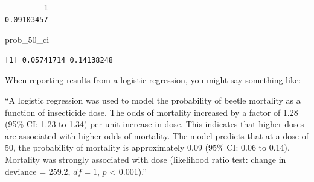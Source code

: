 \documentclass[
  letterpaper,
  8pt,
  a4paper]{book}
\newenvironment{Shaded}{\begin{snugshade}}{\end{snugshade}}
\newcommand{\AttributeTok}[1]{\textcolor[rgb]{0.40,0.45,0.13}{#1}}
\newcommand{\ConstantTok}[1]{\textcolor[rgb]{0.56,0.35,0.01}{#1}}
\newcommand{\DecValTok}[1]{\textcolor[rgb]{0.68,0.00,0.00}{#1}}
\newcommand{\FloatTok}[1]{\textcolor[rgb]{0.68,0.00,0.00}{#1}}
\newcommand{\FunctionTok}[1]{\textcolor[rgb]{0.28,0.35,0.67}{#1}}
\newcommand{\NormalTok}[1]{\textcolor[rgb]{0.00,0.23,0.31}{#1}}
\newcommand{\OtherTok}[1]{\textcolor[rgb]{0.00,0.23,0.31}{#1}}
\newcommand{\SpecialCharTok}[1]{\textcolor[rgb]{0.37,0.37,0.37}{#1}}
\newcommand{\StringTok}[1]{\textcolor[rgb]{0.13,0.47,0.30}{#1}}
\begin{document}
\begin{Shaded}
\end{Shaded}

\begin{verbatim}
         1 
0.09103457 
\end{verbatim}

\begin{Shaded}
\begin{Highlighting}[]
\NormalTok{prob\_50\_ci}
\end{Highlighting}
\end{Shaded}

\begin{verbatim}
[1] 0.05741714 0.14138248
\end{verbatim}

When reporting results from a logistic regression, you might say
something like:

``A logistic regression was used to model the probability of beetle
mortality as a function of insecticide dose. The odds of mortality
increased by a factor of 1.28 (95\% CI: 1.23 to 1.34) per unit increase
in dose. This indicates that higher doses are associated with higher
odds of mortality. The model predicts that at a dose of 50, the
probability of mortality is approximately 0.09 (95\% CI: 0.06 to 0.14).
Mortality was strongly associated with dose (likelihood ratio test:
change in deviance = 259.2, \(df = 1\), \(p\) \textless{} 0.001).''
\end{document}
